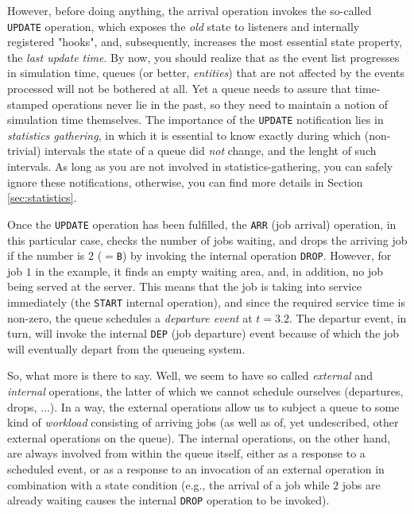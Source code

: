 \documentclass[12pt]{book}
\begin{document}
However, before doing anything,
  the arrival operation invokes
  the so-called \lstinline|UPDATE| operation,
  which exposes the {\em old\/} state
  to listeners and internally registered "hooks",
  and, subsequently, increases the most essential state
  property, the {\em last update time}.
By now, you should realize that
  as the event list progresses in simulation time,
  queues (or better, {\em entities\/})
  that are not affected by the events processed
  will not be bothered at all.
Yet a queue needs to assure that time-stamped operations
  never lie in the past,
  so they need to maintain a notion of simulation time themselves.
The importance of the \lstinline|UPDATE| notification
  lies in {\em statistics gathering},
  in which it is essential to know exactly
  during which (non-trivial) intervals
  the state of a queue did {\em not\/} change,
  and the lenght of such intervals.
As long as you are not involved in statistics-gathering,
  you can safely ignore these notifications,
  otherwise,
  you can find more details in Section \ref{sec:statistics}.

Once the \lstinline|UPDATE| operation has been
  fulfilled, the \lstinline|ARR| (job arrival) operation,
  in this particular case,
  checks the number of jobs waiting,
  and drops the arriving job if the number is $2$ ($=$\lstinline|B|)
  by invoking the internal operation \lstinline|DROP|.
However, for job $1$ in the example,
  it finds an empty waiting area,
  and, in addition, no job being served at the server.
This means that the job is taking into service immediately
  (the \lstinline|START| internal operation),
  and since the required service time is non-zero,
  the queue schedules a {\em departure event\/}
  at $t=3.2$.
The departur event, in turn,
  will invoke the internal \lstinline|DEP| (job departure)
  event because of which the job
  will eventually depart from the queueing system.

So, what more is there to say.
Well, we seem to have so called {\em external\/}
  and {\em internal\/} operations,
  the latter of which we cannot schedule ourselves
  (departures, drops, $\ldots$).
In a way, the external operations allow us
  to subject a queue to some kind of {\em workload\/}
  consisting of arriving jobs
  (as well as of, yet undescribed, other external operations on the queue).
The internal operations, on the other hand,
  are always involved from within the queue itself,
  either as a response to a scheduled event,
  or as a response to an invocation of an external operation
  in combination with a state condition
  (e.g., the arrival of a job while $2$ jobs are already waiting
  causes the internal \lstinline|DROP| operation to be invoked).
 
\end{document}
